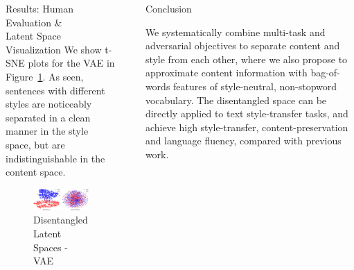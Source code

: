 \documentclass[final]{beamer}
\newlength{\sepwid}
\newlength{\onecolwid}
\newlength{\twocolwid}
\begin{document}
\begin{frame}[t]
\begin{columns}[t]
\begin{column}{\twocolwid}
\begin{columns}[t,totalwidth=\twocolwid]
\begin{column}{\onecolwid}
\begin{block}{Results: Human Evaluation \&\\Latent Space Visualization}
                        We show t-SNE plots for the VAE in Figure~\ref{fig:tsne-plot}.
                        As seen, sentences with different styles are noticeably separated in a clean manner in the style space, but are indistinguishable in the content space.
                        \begin{figure}
                            \includegraphics[width=\linewidth]{vae-latent-spaces}
                            \caption{Disentangled Latent Spaces - VAE}
                            \label{fig:tsne-plot}
                        \end{figure}

                    \end{block}


                \end{column} %

            \end{columns} %

        \end{column} %

        \begin{column}{\sepwid}\end{column} %

        \begin{column}{\onecolwid} %


            \begin{block}{Conclusion}

                We systematically combine multi-task and adversarial objectives to separate content and style from each other, where we also propose to approximate content information with bag-of-words features of style-neutral, non-stopword vocabulary.
                The disentangled space can be directly applied to text style-transfer tasks, and achieve high style-transfer, content-preservation and language fluency, compared with previous work.


\end{block}
\end{column}
\end{columns}
\end{frame}
\end{document}
